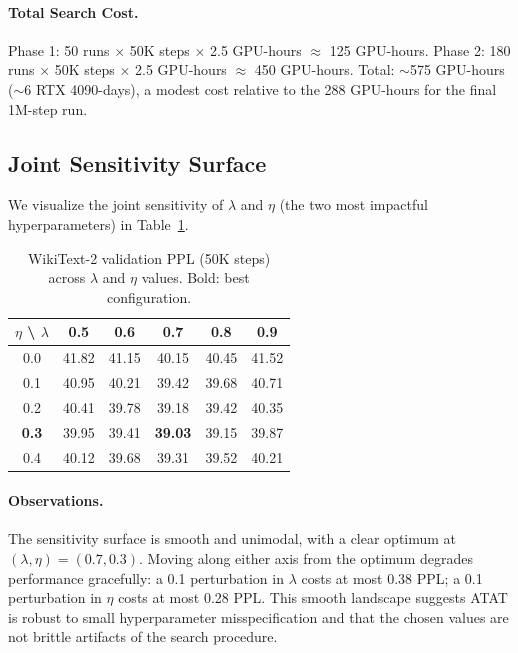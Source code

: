\paragraph{Total Search Cost.} Phase 1: 50 runs $\times$ 50K steps $\times$ 2.5 GPU-hours $\approx$ 125 GPU-hours. Phase 2: 180 runs $\times$ 50K steps $\times$ 2.5 GPU-hours $\approx$ 450 GPU-hours. Total: ${\sim}$575 GPU-hours (${\sim}$6 RTX 4090-days), a modest cost relative to the 288 GPU-hours for the final 1M-step run.

\subsection{Joint Sensitivity Surface}

We visualize the joint sensitivity of $\lambda$ and $\eta$ (the two most impactful hyperparameters) in Table~\ref{tab:joint-sensitivity}.

\begin{table}[h]
\centering
\caption{WikiText-2 validation PPL (50K steps) across $\lambda$ and $\eta$ values. Bold: best configuration.}
\label{tab:joint-sensitivity}
\begin{tabular}{c|ccccc}
\toprule
$\eta$ \textbackslash{} $\lambda$ & 0.5 & 0.6 & 0.7 & 0.8 & 0.9 \\
\midrule
0.0 & 41.82 & 41.15 & 40.15 & 40.45 & 41.52 \\
0.1 & 40.95 & 40.21 & 39.42 & 39.68 & 40.71 \\
0.2 & 40.41 & 39.78 & 39.18 & 39.42 & 40.35 \\
\textbf{0.3} & 39.95 & 39.41 & \textbf{39.03} & 39.15 & 39.87 \\
0.4 & 40.12 & 39.68 & 39.31 & 39.52 & 40.21 \\
\bottomrule
\end{tabular}
\end{table}

\paragraph{Observations.} The sensitivity surface is smooth and unimodal, with a clear optimum at $(\lambda, \eta) = (0.7, 0.3)$. Moving along either axis from the optimum degrades performance gracefully: a 0.1 perturbation in $\lambda$ costs at most 0.38 PPL; a 0.1 perturbation in $\eta$ costs at most 0.28 PPL. This smooth landscape suggests ATAT is robust to small hyperparameter misspecification and that the chosen values are not brittle artifacts of the search procedure.


